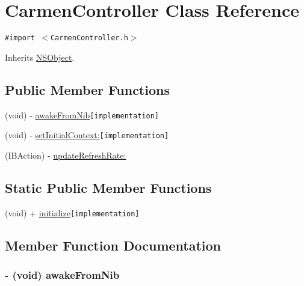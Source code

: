 \hypertarget{interface_carmen_controller}{
\section{CarmenController Class Reference}
\label{interface_carmen_controller}
}
{\tt \#import $<$CarmenController.h$>$}

Inherits \hyperlink{class_n_s_object}{NSObject}.

\subsection*{Public Member Functions}
\begin{CompactItemize}
\item 
(void) - \hyperlink{interface_carmen_controller_55a59c5638e12e3b0d6137e86478dd74}{awakeFromNib}{\tt  \mbox{[}implementation\mbox{]}}
\item 
(void) - \hyperlink{interface_carmen_controller_6112359aad17b09d7772b0869937482e}{setInitialContext:}{\tt  \mbox{[}implementation\mbox{]}}
\item 
(IBAction) - \hyperlink{interface_carmen_controller_e0c863ef0e9b896a42536c29f387b573}{updateRefreshRate:}
\end{CompactItemize}
\subsection*{Static Public Member Functions}
\begin{CompactItemize}
\item 
(void) + \hyperlink{interface_carmen_controller_188c5bdfc74f32db0c55e28733d24324}{initialize}{\tt  \mbox{[}implementation\mbox{]}}
\end{CompactItemize}


\subsection{Member Function Documentation}
\hypertarget{interface_carmen_controller_55a59c5638e12e3b0d6137e86478dd74}{
\subsubsection[awakeFromNib]{\setlength{\rightskip}{0pt plus 5cm}- (void) awakeFromNib }}
\label{interface_carmen_controller_55a59c5638e12e3b0d6137e86478dd74}



